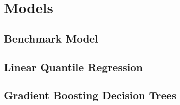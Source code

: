 
\section{Models}
\label{ch:Models}

\subsection{Benchmark Model}
\subsection{Linear Quantile Regression}
\subsection{Gradient Boosting Decision Trees}



\parencite{franz_kiraly_sktimesktime_2024}
